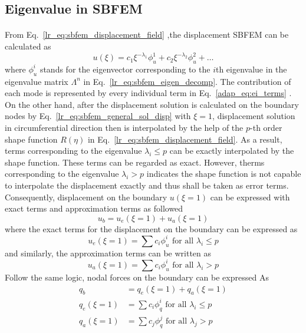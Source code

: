 \subsection{Eigenvalue in SBFEM}
\paragraph{}
From Eq.~\ref{lr_eq:sbfem_displacement_field} ,the displacement SBFEM can be calculated as
\begin{equation}
    u(\xi) = c_1 \xi ^{-\lambda_1} \phi_u^1
            +c_2 \xi ^{-\lambda_2} \phi_u^2
            +\dots
\label{adap_eq:ei_terms}
\end{equation}
where $\phi_u^i$ stands for the eigenvector corresponding to the $i$th eigenvalue in the eigenvalue matrix $\Lambda^{n}$ in Eq.~\ref{lr_eq:sbfem_eigen_decomp}.
The contribution of each mode is represented by every individual term in Eq.~\ref{adap_eq:ei_terms} \citep{Deeks2002}.
On the other hand, after the displacement solution is calculated on the boundary nodes by Eq.~\ref{lr_eq:sbfem_general_sol_disp} with $\xi=1$, displacement solution in circumferential direction then is interpolated by the help of the $p$-th order shape function $R(\eta)$ in Eq.~\ref{lr_eq:sbfem_displacement_field}.
As a result, terms corresponding to the eigenvalue $\lambda_i \leq p$ can be exactly interpolated by the shape function.
These terms can be regarded as exact.
However, therms corresponding to the eigenvalue $\lambda_i > p$ indicates the shape function is not capable to interpolate the displacement exactly and thus shall be taken as error terms.
Consequently, displacement on the boundary $u(\xi=1)$ can be expressed with exact terms and approximation terms as followed
\begin{equation}
    u_b = u_e (\xi=1) + u_a(\xi=1)
\end{equation}
where the exact terms for the displacement on the boundary can be expressed as
\begin{equation}
    u_e (\xi=1) = \sum c_i \phi_u^i \text{   for all  } \lambda_i \leq p
\end{equation}
and similarly, the approximation terms can be written as
\begin{equation}
    u_a (\xi=1) = \sum c_i \phi_u^i \text{   for all  } \lambda_i > p
\end{equation}
Follow the same logic, nodal forces on the boundary can be expressed As
\begin{equation}
    \begin{aligned}
        q_b &= q_e(\xi=1) + q_a(\xi=1) \\
        q_e(\xi=1) &= \sum c_i \phi_q^i \text{   for all  } \lambda_i \leq p \\
        q_a(\xi=1) &= \sum c_j \phi_q^j \text{   for all  } \lambda_j > p \\
    \end{aligned}
\end{equation}
